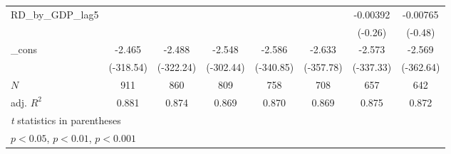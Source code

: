 {\begin{tabular}{l*{7}{c}}
\addlinespace
RD\_by\_GDP\_lag5&                  &                  &                  &                  &                  & -0.00392         & -0.00765         \\
          &                  &                  &                  &                  &                  &  (-0.26)         &  (-0.48)         \\
\addlinespace
\_cons    &   -2.465\sym{***}&   -2.488\sym{***}&   -2.548\sym{***}&   -2.586\sym{***}&   -2.633\sym{***}&   -2.573\sym{***}&   -2.569\sym{***}\\
          &(-318.54)         &(-322.24)         &(-302.44)         &(-340.85)         &(-357.78)         &(-337.33)         &(-362.64)         \\
\midrule
\(N\)     &      911         &      860         &      809         &      758         &      708         &      657         &      642         \\
adj. \(R^{2}\)&    0.881         &    0.874         &    0.869         &    0.870         &    0.869         &    0.875         &    0.872         \\
\bottomrule
\multicolumn{8}{l}{\footnotesize \textit{t} statistics in parentheses}\\
\multicolumn{8}{l}{\footnotesize \sym{*} \(p<0.05\), \sym{**} \(p<0.01\), \sym{***} \(p<0.001\)}\\
\end{tabular}
}
